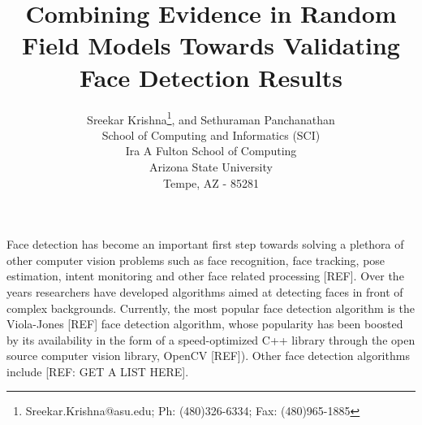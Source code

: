 \documentclass[times, 10pt,twocolumn]{article}
\begin{document}
\title{Combining Evidence in Random Field Models Towards Validating Face Detection Results}

\author{Sreekar Krishna\thanks{Sreekar.Krishna@asu.edu; Ph: (480)326-6334; Fax: (480)965-1885}, and Sethuraman Panchanathan\\
School of Computing and Informatics (SCI) \\ Ira A Fulton School of
Computing \\ Arizona State University \\ Tempe, AZ - 85281 }

\maketitle
\thispagestyle{empty}

\begin{abstract}

\end{abstract}

\label{Introduction} Face detection has become
an important first step towards solving a plethora of other computer
vision problems such as face recognition, face tracking, pose
estimation, intent monitoring and other face related processing
[REF]. Over the years researchers have developed algorithms aimed at detecting faces in
front of complex backgrounds. Currently, the most popular face detection
algorithm is the Viola-Jones [REF] face detection algorithm,
whose popularity has been boosted by its availability in the form of
a speed-optimized C++ library
through the open source computer vision library, OpenCV [REF]).
Other face detection algorithms include [REF: GET A LIST HERE].
\end{document}
